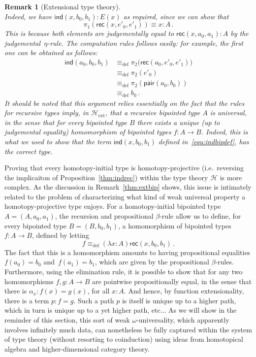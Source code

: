 \documentclass[reqno,10pt,a4paper,oneside]{amsart}
\numberwithin{equation}{section}
\theoremstyle{mythm}
\theoremstyle{mydef}
\theoremstyle{myrmk}
\newtheorem{remark}[theorem]{Remark}
\newcommand{\deq}{\equiv}
\newcommand{\defeq}{\deq_{\mathrm{def}}}
\newcommand{\co}{\colon}
\newcommand{\Hint}{\mathcal{H}}
\newcommand{\Hext}{\mathcal{H}_{\mathrm{ext}}}
\newcommand{\pair}{\mathsf{pair}}
\newcommand{\ind}{\mathsf{ind}}
\newcommand{\rec}{\mathsf{rec}}
\begin{document}
\begin{remark}[Extensional type theory]
\begin{equation}
\end{equation}
Indeed, we have $\ind(x, b_0, b_1) \co E(x)$ as required, since we can show that
\[
\pi_1 ( \rec(x, e'_0, e'_1))  \deq x \co A \, .
\]
This is because both elements are judgementally equal to $\rec(x, a_0, a_1)  \co A$ by the
judgemental~$\eta$-rule. The computation rules follows easily: for example, the first one
can be obtained as follows:
\begin{align*} 
\ind(a_0, b_0, b_1)  & \defeq \pi_2 \big(  \rec(a_0, e'_0, e'_1) \big) \\
 & \defeq \pi_2 (e'_0) \\
 & \defeq \pi_2 (\pair(a_0, b_0)) \\
 & \defeq b_0 \, .
\end{align*}
It should be noted that this argument relies essentially on the fact that the rules for recursive types
imply, in $\Hext$, that a recursive bipointed type $A$ is universal, in the sense that for every bipointed 
type $B$ there exists a unique (up to judgemental equality) homomorphism of bipointed types $f \co A \to B$.
Indeed, this is what we used to show that the term $\ind(x, b_0, b_1)$ defined in~\eqref{equ:indbipdef}, has
the correct type.
\end{remark}

\medskip

Proving that every homotopy-initial type is homotopy-projective (i.e.\ reversing the implicaiton of Proposition~\ref{thm:indrec}) within
the type theory $\Hint$ is more complex. As the discussion in Remark~\ref{thm:extbip} shows, this issue is intimately related to the problem of characterizing what kind of weak universal property
 a homotopy-projective type enjoys. For a homotopy-initial bipointed type $A = (A, a_0, a_1)$, the recursion and propositional $\beta$-rule allow us to define, for every bipointed type $B = (B, b_0, b_1)$, a homomorphism of
bipointed types~$f \co A \to B$, defined by letting 
\[
f \defeq (\lambda x \co A) \rec(x, b_0, b_1) \, .
\] 
The fact that this is a homomorphism amounts to having  propositional equalities $f(a_0) = b_0$ and~$f(a_1) = b_1$,
which are given by the propositional $\beta$-rules. Furthermore, using the elimination rule, it is
possible to show that for any two homomorphisms $f, g \co A \to B$ are pointwise propositionally equal, in the sense that there is $ \alpha_x \co f(x) = g(x)$, for all $x \co A$. And hence, by function extensionality, there is a term 
$p \co f = g$. Such a path $p$ is itself is unique up to a higher path, which in turn is unique up to a yet higher path, etc... As we will show in the reminder of this section, this sort of weak $\omega$-universality, which apparently involves infinitely much data, can nonetheless be fully captured within the system of type theory (without resorting to coinduction) using ideas from homotopical algebra and higher-dimensional category theory. 
\end{document}
